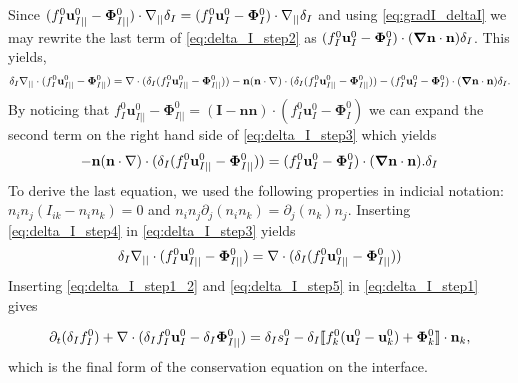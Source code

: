 Since $ (f_I^0 \textbf{u}_{I||}^0 - \mathbf{\Phi}_{I||}^0 )\cdot\mathbf{\nabla}_{||}\delta_I  = (f_I^0 \textbf{u}_{I}^0 - \mathbf{\Phi}_{I}^0 )\cdot\mathbf{\nabla}_{||}\delta_I$ and using \ref{eq:gradI_deltaI} we may rewrite the last term of \ref{eq:delta_I_step2} as $(f_I^0 \textbf{u}_{I}^0 - \mathbf{\Phi}_{I}^0 )\cdot(\bm{\mathbf{\nabla}}\textbf{n}\cdot \textbf{n}) \delta_I$. This yields,
\begin{equation}
    \delta_I \divI (f_I^0 \textbf{u}_{I||}^0
    - \mathbf{\Phi}_{I||}^0 ) %
    = 
    \div (\delta_I (f_I^0 \textbf{u}_{I||}^0
    - \mathbf{\Phi}_{I||}^0 ))
    - \textbf{n}(\textbf{n}\cdot\grad)\cdot (\delta_I (f_I^0 \textbf{u}_{I||}^0
    - \mathbf{\Phi}_{I||}^0 ))
    - (f_I^0 \textbf{u}_{I}^0 - \mathbf{\Phi}_{I}^0 )\cdot(\bm\grad\textbf{n}\cdot \textbf{n}) \delta_I.
\label{eq:delta_I_step3}
\end{equation}
By noticing that $f_I^0 \textbf{u}_{I||}^0
    - \mathbf{\Phi}_{I||}^0 = (\textbf{I} - \textbf{nn})\cdot (f_I^0 \textbf{u}_{I}^0
    - \mathbf{\Phi}_{I}^0 )$ we can expand the second term on the right hand side of \ref{eq:delta_I_step3} which yields
\begin{equation}
    - \textbf{n}(\textbf{n}\cdot\grad)\cdot (\delta_I (f_I^0 \textbf{u}_{I||}^0
    - \mathbf{\Phi}_{I||}^0 )) = (f_I^0 \textbf{u}_{I}^0 - \mathbf{\Phi}_{I}^0 )\cdot(\bm\grad\textbf{n}\cdot \textbf{n}). \delta_I%
\label{eq:delta_I_step4}
\end{equation}
To derive the last equation, we used the following properties in indicial notation: $n_in_j(I_{ik}-n_in_k) =0$ and $n_in_j\partial_{j}(n_in_k)=\partial_{j}(n_k)n_j$. Inserting \ref{eq:delta_I_step4} in \ref{eq:delta_I_step3} yields
\begin{equation}
    \delta_I \divI (f_I^0 \textbf{u}_{I||}^0
    - \mathbf{\Phi}_{I||}^0 ) %
    = 
    \div (\delta_I (f_I^0 \textbf{u}_{I||}^0
    - \mathbf{\Phi}_{I||}^0 ))
\label{eq:delta_I_step5}
\end{equation}
Inserting \ref{eq:delta_I_step1_2} and \ref{eq:delta_I_step5} in \ref{eq:delta_I_step1} gives

\begin{equation}
    \partial_t (\delta_If_I^0)  
    + \mathbf{\nabla}\cdot (
        \delta_I f_I^0 \textbf{u}_I^0
        - \delta_I \mathbf{\Phi}_{I||}^0 
        )
    = 
    \delta_Is_I^0
    - \delta_I\llbracket 
    f_k^0 (\textbf{u}_I^0 - \textbf{u}_k^0)
    + \mathbf{\Phi}_k^0 \rrbracket \cdot \textbf{n}_k,
\end{equation}
which is the final form of the conservation equation on the interface.

